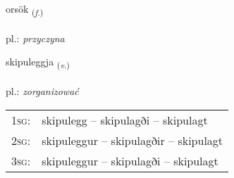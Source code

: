 \documentclass[frontgrid, backgrid]{flacards}\usepackage[]{graphicx}\usepackage[]{xcolor}
\begin{document}
\renewcommand{\blhead}{\vskip5pt {\small\bfseries\footnotesize Nafnorð | Noun }}
\renewcommand{\bcfoot}{\vskip5pt \hspace{2pt}{\small\bfseries\footnotesize 2K}}


{orsök \small{\textsubscript{(\textit{f.})}} \\[1ex] %
\textphonetic{[ɔr̥sœk]} \\
pl.: \emph{przyczyna} \\  [2ex]
\renewcommand*{\arraystretch}{0.8}
}

\renewcommand{\flhead}{\vskip5pt \fboxsep=0pt {\small\bfseries\footnotesize Sagnorð | Verb}}
\renewcommand{\fcfoot}{\vskip5pt \fboxsep=0pt \hspace{2pt}{\small\bfseries\footnotesize 2K}}

\renewcommand{\blhead}{\vskip5pt {\small\bfseries\footnotesize Sagnorð | Verb }}
\renewcommand{\bcfoot}{\vskip5pt \hspace{2pt}{\small\bfseries\footnotesize 2K}}


{skipuleggja \small{\textsubscript{(\textit{v.})}} \\[1ex] %
\textphonetic{[scɪːpʏlɛca]} \\
pl.: \emph{zorganizować} \\  [2ex]
\renewcommand*{\arraystretch}{0.8}
\begin{tabular}{p{1cm}l}
\textsc{1sg}: & skipulegg -- skipulagði -- skipulagt \\ 
\textsc{2sg}: & skipuleggur -- skipulagðir -- skipulagt \\ 
\textsc{3sg}: & skipuleggur -- skipulagði -- skipulagt \\ 
\end{tabular}
}
\end{document}
